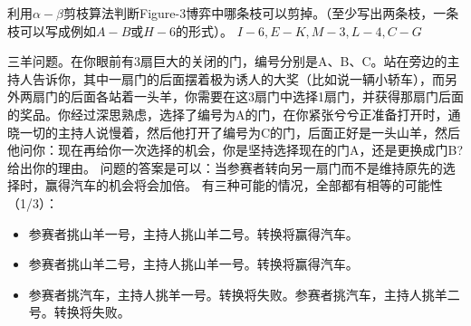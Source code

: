 \begin{problem}
	利用$\alpha-\beta$剪枝算法判断Figure-3博弈中哪条枝可以剪掉。（至少写出两条枝，一条枝可以写成例如$A-B$或$H-6$的形式）。
	\solution $I-6, E-K, M-3, L-4, C-G$
\end{problem}

\begin{problem}	
	三羊问题。在你眼前有$3$扇巨大的关闭的门，编号分别是A、B、C。站在旁边的主持人告诉你，其中一扇门的后面摆着极为诱人的大奖（比如说一辆小轿车），而另外两扇门的后面各站着一头羊，你需要在这3扇门中选择1扇门，并获得那扇门后面的奖品。你经过深思熟虑，选择了编号为A的门，在你紧张兮兮正准备打开时，通晓一切的主持人说慢着，然后他打开了编号为C的门，后面正好是一头山羊，然后他问你：现在再给你一次选择的机会，你是坚持选择现在的门A，还是更换成门B?给出你的理由。
	\solution 问题的答案是可以：当参赛者转向另一扇门而不是维持原先的选择时，赢得汽车的机会将会加倍。
	有三种可能的情况，全部都有相等的可能性（1/3）：
	\begin{itemize}
		\item 参赛者挑山羊一号，主持人挑山羊二号。转换将赢得汽车。
		\item 参赛者挑山羊二号，主持人挑山羊一号。转换将赢得汽车。
		\item 参赛者挑汽车，主持人挑羊一号。转换将失败。参赛者挑汽车，主持人挑羊二号。转换将失败。
	\end{itemize}
\end{problem}


